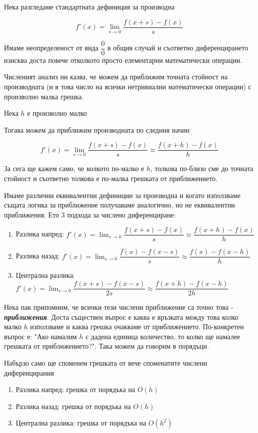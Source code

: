 \documentclass{scrartcl}
\begin{document}
\begin{flushleft}
Нека разгледаме стандартната дефиниция за производна

$$f'(x) = \lim_{s\to 0}\dfrac{f(x+s)-f(x)}{s}$$

Имаме неопределеност от вида $\dfrac{0}{0}$ в общия случай и съответно диференцирането изисква доста повече отколкото просто елементарни математически операции.

Численият анализ ни казва, че можем да приближим точната стойност на производната (и в това число на всички нетривиални математически операции) с произволно малка грешка.

Нека $h$ е произволно малко

Тогава можем да приближим производната по следния начин

$$f'(x) = \lim_{s\to 0}\dfrac{f(x+s)-f(x)}{s} \approx \dfrac{f(x+h)-f(x)}{h}$$

За сега ще кажем само, че колкото по-малко е $h$, толкова по-близо сме до точната стойност и съответно толкова е по-малка грешката от приближението.

Имаме различни еквивалентни дефиниции за производна и когато използваме същата логика за приближение получаваме аналогично, но не еквивалентни приближения. Ето 3 подхода за числено диференциране:

\begin{enumerate}
    \item Разлика напред: $f'(x) = \displaystyle \lim_{s\to 0}\dfrac{f(x+s)-f(x)}{s} \approx \dfrac{f(x+h)-f(x)}{h}$
    \item Разлика назад: $f'(x) = \displaystyle \lim_{s\to 0}\dfrac{f(x)-f(x-s)}{s} \approx \dfrac{f(x)-f(x-h)}{h}$
    \item Централна разлика: $f'(x) = \displaystyle \lim_{s\to 0}\dfrac{f(x+s)-f(x-s)}{2s} \approx \dfrac{f(x+h)-f(x-h)}{2h}$
\end{enumerate}

Нека пак припомним, че всички тези числени приближение са точно това - \textbf{\textit{приближения}}. Доста съществен въпрос е каква е връзката между това колко малко $h$ използваме и каква грешка очакваме от приближението. По-конкретен въпрос е: "Ако намалим $h$ с дадена единица количество, то колко ще намалее грешката от приближението?". Така можем да говорим в порядъци.

Набързо само ще споменем грешката от вече споменатите числени диференцирания

\begin{enumerate}
    \item Разлика напред: грешка от порядъка на $O(h)$
    \item Разлика назад: грешка от порядъка на $O(h)$
    \item Централна разлика: грешка от порядъка на $O(h^2)$
\end{enumerate}


\end{flushleft}
\end{document}

